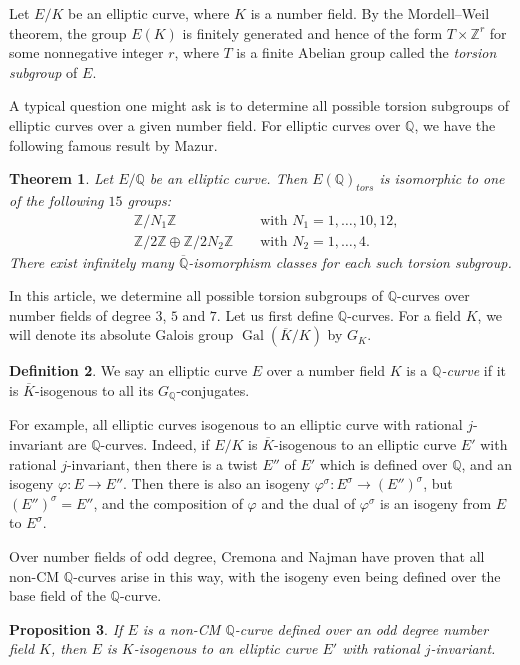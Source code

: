 \documentclass[10pt,leqno]{amsart}
\newcommand{\Z}{\mathbb{Z}}
\newcommand{\Q}{\mathbb{Q}}
\DeclareMathOperator{\Gal}{Gal}
\newtheorem{theorem}{Theorem}[]
\newtheorem{proposition}[theorem]{Proposition}
\theoremstyle{definition}
\newtheorem{definition}[theorem]{Definition}
\theoremstyle{remark}
\numberwithin{theorem}{section}
\begin{document}
\noindent
Let $E/K$ be an elliptic curve, where $K$ is a number field. By the Mordell--Weil theorem, the group $E(K)$ is finitely generated and hence of the form $T \times \mathbb Z^r$ for some nonnegative integer $r$, where $T$ is a finite Abelian group called the \emph{torsion subgroup} of $E$.

A typical question one might ask is to determine all possible torsion subgroups of elliptic curves over a given number field. For elliptic curves over $\Q$, we have the following famous result by Mazur.

\begin{theorem}\label{mazur}\cite{Mazur}
    Let $E/\Q$ be an elliptic curve. Then $E(\Q)_{tors}$ is isomorphic to one of the following $15$ groups:
   \begin{align*}
            &\Z/N_1\Z && \text{ with } N_1=1,\ldots,10,12, \\
            &\Z/2\Z\oplus \Z/2N_2\Z && \text{ with } N_2=1,\ldots, 4.
        \end{align*}
        There exist infinitely many $\overline{\Q}$-isomorphism classes for each such torsion subgroup.
\end{theorem}
In this article, we determine all possible torsion subgroups of $\Q$-curves over number fields of degree $3$, $5$ and $7$. Let us first define $\Q$-curves. For a field $K$, we will denote its absolute Galois group $\Gal(\overline K/K)$ by $G_K$.
\begin{definition}
We say an elliptic curve $E$ over a number field $K$ is a \emph{$\Q$-curve} if it is $\overline K$-isogenous to all its $G_\Q$-conjugates. 
\end{definition}

For example, all elliptic curves isogenous to an elliptic curve with rational $j$-invariant are $\Q$-curves. Indeed, if $E/K$ is $\overline K$-isogenous to an elliptic curve $E'$ with rational $j$-invariant, then there is a twist $E''$ of $E'$ which is defined over $\Q$, and an isogeny $\varphi: E \to E''$. Then there is also an isogeny $\varphi^\sigma: E^\sigma \to (E'')^\sigma$, but $(E'')^\sigma=E''$, and the composition of $\varphi$ and the dual of $\varphi^\sigma$ is an isogeny from $E$ to $E^\sigma$.

Over number fields of odd degree, Cremona and Najman have proven that all non-CM $\Q$-curves arise in this way, with the isogeny even being defined over the base field of the $\Q$-curve.

\begin{proposition}\label{isog to rational j}\cite[Theorem 2.7.]{cremona-najman}
If $E$ is a non-CM $\Q$-curve defined over an odd degree number field $K$, then $E$ is $K$-isogenous to an elliptic curve $E'$ with rational $j$-invariant.    
\end{proposition}
\end{document}
